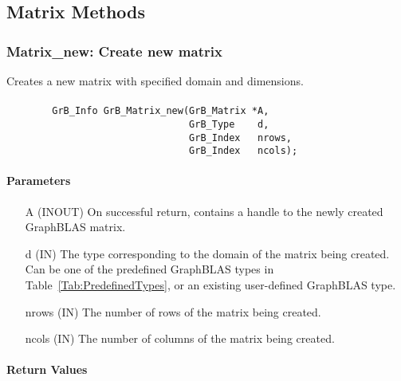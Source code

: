 \subsection{Matrix Methods}

\subsubsection{{\sf Matrix\_new}: Create new matrix}

Creates a new matrix with specified domain and dimensions.

\paragraph{\syntax}

\begin{verbatim}
        GrB_Info GrB_Matrix_new(GrB_Matrix *A,
                                GrB_Type    d,
                                GrB_Index   nrows,
                                GrB_Index   ncols);
\end{verbatim}

\paragraph{Parameters}

\begin{itemize}[leftmargin=1.1in]
    \item[{\sf A}] ({\sf INOUT}) On successful return, contains a handle to 
                                 the newly created GraphBLAS matrix.
    \item[{\sf d}] ({\sf IN})    The type corresponding to the domain of the matrix 
                                 being created. Can be one of the predefined
                                 GraphBLAS types in Table~\ref{Tab:PredefinedTypes}, 
                                 or an existing user-defined GraphBLAS type.
    \item[{\sf nrows}] ({\sf IN}) The number of rows of the matrix being created.
    \item[{\sf ncols}] ({\sf IN}) The number of columns of the matrix being created.
\end{itemize}


\paragraph{Return Values}

